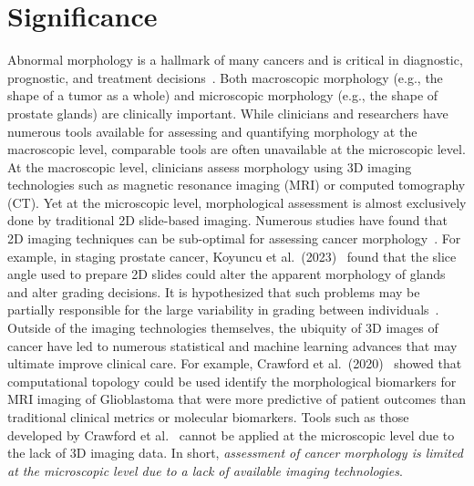 \documentclass{NIHGrant}
\theoremstyle{theorem}
\begin{document}
\section*{Significance}
Abnormal morphology is a hallmark of many cancers and is critical in
diagnostic, prognostic, and treatment decisions~\cite{kumar_robbins_2017}. Both macroscopic
morphology (e.g., the shape of a tumor as a whole) and microscopic morphology
(e.g., the shape of prostate glands) are clinically important. While
clinicians and researchers have numerous tools available for assessing and
quantifying morphology at the macroscopic level, comparable tools are often
unavailable at the microscopic level. At the macroscopic level, clinicians
assess morphology using 3D imaging technologies such as magnetic resonance
imaging (MRI) or computed tomography (CT). Yet at the microscopic level,
morphological assessment is almost exclusively done by traditional 2D
slide-based imaging. Numerous studies have found that 2D imaging techniques can be
sub-optimal for assessing cancer morphology~\cite{xie_prostate_2022,koyuncu_visual_2023,pinkert-leetsch_three-dimensional_2023}. For example, in staging
prostate cancer, Koyuncu et al.~(2023)~\cite{koyuncu_visual_2023}
found that the slice angle used to prepare 2D
slides could alter the apparent morphology of glands and alter grading
decisions. It is hypothesized that such problems may be partially
responsible for the large variability in grading between individuals~\cite{ozkan_interobserver_2016}.
Outside of the imaging technologies themselves, the ubiquity of 3D images of
cancer have led to numerous statistical and machine learning advances that may
ultimate improve clinical care. For example, Crawford et al.~(2020)~\cite{crawford_predicting_2020} showed that
computational topology could be used identify the morphological biomarkers for
MRI imaging of Glioblastoma that were more predictive of patient outcomes than
traditional clinical metrics or molecular biomarkers. Tools such
as those developed by Crawford et al.~\cite{crawford_predicting_2020,lawson_persistent_2019} cannot be applied at the
microscopic level due to the lack of 3D imaging data. In short,
\emph{assessment of cancer morphology is limited at the microscopic level due
  to a lack of available imaging technologies}.
\end{document}
